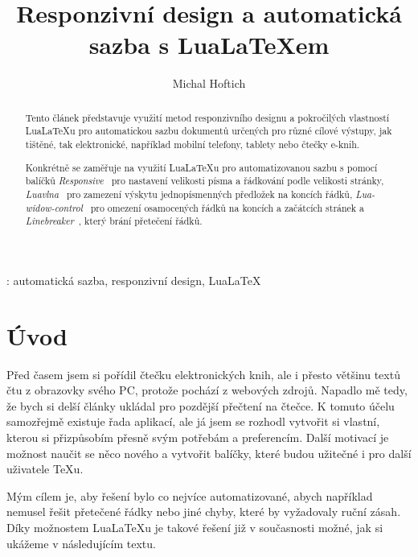 \documentclass{csbulletin}
\newcommand\balicek[1]{\textit{#1}}
\newcommand\program[1]{#1}
\begin{document}
\title{Responzivní design a automatická sazba s Lua\LaTeX em}
\author{Michal Hoftich}
\maketitle

\begin{abstract}
Tento článek představuje využití metod responzivního designu a pokročilých vlastností
Lua\LaTeX u pro automatickou sazbu dokumentů určených pro různé cílové výstupy,
jak tištěné, tak elektronické, například mobilní telefony, tablety nebo čtečky e-knih.


Konkrétně se zaměřuje na využití Lua\LaTeX u pro automatizovanou
sazbu s pomocí balíčků \balicek{Responsive}~\cite{responsive} pro nastavení velikosti písma a řádkování 
podle velikosti stránky, \balicek{Luavlna}~\cite{luavlna} pro zamezení výskytu jednopísmenných předložek
na koncích řádků, \balicek{Lua-widow-control}~\cite{lua-widow-control} pro omezení osamocených řádků na koncích a
začátcích stránek a \balicek{Linebreaker}~\cite{linebreaker}, který brání přetečení řádků.

\end{abstract}
\klicovaslova: automatická sazba, responzivní design, Lua\LaTeX

\section{Úvod}

Před časem jsem si pořídil čtečku elektronických knih, ale i přesto většinu
textů čtu z obrazovky svého PC, protože pochází z webových zdrojů. 
Napadlo mě tedy, že bych si delší články ukládal pro pozdější
přečtení na čtečce. K tomuto účelu samozřejmě existuje řada aplikací, ale 
já jsem se rozhodl vytvořit si vlastní, kterou si přizpůsobím přesně svým potřebám
a preferencím. Další motivací je možnost naučit se něco nového a vytvořit
balíčky, které budou užitečné i pro další uživatele \TeX u. 

Mým cílem je, aby řešení bylo co nejvíce automatizované, abych například nemusel
řešit přetečené řádky nebo jiné chyby, které by vyžadovaly ruční zásah. 
Díky možnostem Lua\LaTeX u je takové řešení již v současnosti možné, 
jak si ukážeme v následujícím textu.


\end{document}
